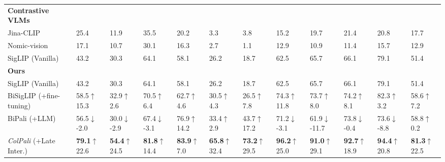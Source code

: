 \begin{table}[ht]
{\begin{tabular}{ll@{\hskip 0.5em}l@{\hskip 0.5em}l@{\hskip 0.5em}l@{\hskip 0.5em}l@{\hskip 0.5em}l@{\hskip 0.5em}l@{\hskip 0.5em}l@{\hskip 0.5em}l@{\hskip 0.5em}l|@{\hskip 0.5em}l}
    \multicolumn{0}{l}{\textbf{Contrastive VLMs}}&&&&&&&&&&&\\
    Jina-CLIP & 25.4 & 11.9 & 35.5 & 20.2 & 3.3 & 3.8 & 15.2 & 19.7 & 21.4 & 20.8 & 17.7 \\
    Nomic-vision & 17.1 & 10.7 & 30.1 & 16.3 & 2.7 & 1.1 & 12.9 & 10.9 & 11.4 & 15.7 & 12.9\\
    SigLIP \tiny(Vanilla)& 43.2 & 30.3 & 64.1 & 58.1 & 26.2 & 18.7 & 62.5 & 65.7 & 66.1 & 79.1 & 51.4 \\
\midrule
\multicolumn{0}{l}{\textbf{Ours}}&&&&&&&&&&&\\
SigLIP \tiny(Vanilla)& 43.2 & 30.3 & 64.1 & 58.1 & 26.2 & 18.7 & 62.5 & 65.7 & 66.1 & 79.1 & 51.4 \\
BiSigLIP \tiny (+fine-tuning) & 58.5\textcolor{green!75!black}{\tiny $\uparrow$15.3} & 32.9\textcolor{green!75!black}{\tiny $\uparrow$2.6} & 70.5\textcolor{green!75!black}{\tiny $\uparrow$6.4} & 62.7\textcolor{green!75!black}{\tiny $\uparrow$4.6} & 30.5\textcolor{green!75!black}{\tiny $\uparrow$4.3} & 26.5\textcolor{green!75!black}{\tiny $\uparrow$7.8} & 74.3\textcolor{green!75!black}{\tiny $\uparrow$11.8} & 73.7\textcolor{green!75!black}{\tiny $\uparrow$8.0} & 74.2\textcolor{green!75!black}{\tiny $\uparrow$8.1} & 82.3\textcolor{green!75!black}{\tiny $\uparrow$3.2} & 58.6\textcolor{green!75!black}{\tiny $\uparrow$7.2}\\

BiPali \tiny (+LLM) & 56.5\textcolor{red!75!black}{\tiny $\downarrow$-2.0} & 30.0\textcolor{red!75!black}{\tiny $\downarrow$-2.9} & 67.4\textcolor{red!75!black}{\tiny $\downarrow$-3.1} & 76.9\textcolor{green!75!black}{\tiny $\uparrow$14.2} & 33.4\textcolor{green!75!black}{\tiny $\uparrow$2.9} & 43.7\textcolor{green!75!black}{\tiny $\uparrow$17.2} & 71.2\textcolor{red!75!black}{\tiny $\downarrow$-3.1} & 61.9\textcolor{red!75!black}{\tiny $\downarrow$-11.7} & 73.8\textcolor{red!75!black}{\tiny $\downarrow$-0.4} & 73.6\textcolor{red!75!black}{\tiny $\downarrow$-8.8} & 58.8\textcolor{green!75!black}{\tiny $\uparrow$0.2}\\
\textit{ColPali} \tiny (+Late Inter.) & \textbf{79.1}\textcolor{green!75!black}{\tiny $\uparrow$22.6} & \textbf{54.4}\textcolor{green!75!black}{\tiny $\uparrow$24.5} & \textbf{81.8}\textcolor{green!75!black}{\tiny $\uparrow$14.4} & \textbf{83.9}\textcolor{green!75!black}{\tiny $\uparrow$7.0} & \textbf{65.8}\textcolor{green!75!black}{\tiny $\uparrow$32.4} & \textbf{73.2}\textcolor{green!75!black}{\tiny $\uparrow$29.5} & \textbf{96.2}\textcolor{green!75!black}{\tiny $\uparrow$25.0} & \textbf{91.0}\textcolor{green!75!black}{\tiny $\uparrow$29.1} & \textbf{92.7}\textcolor{green!75!black}{\tiny $\uparrow$18.9} & \textbf{94.4}\textcolor{green!75!black}{\tiny $\uparrow$20.8} & \textbf{81.3}\textcolor{green!75!black}{\tiny $\uparrow$22.5}\\


\end{tabular}}
\end{table}
